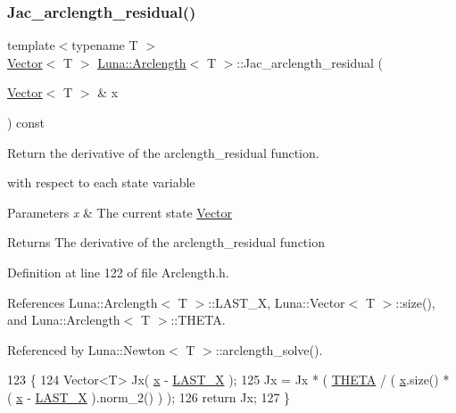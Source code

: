 \subsubsection{\texorpdfstring{Jac\+\_\+arclength\+\_\+residual()}{Jac\_arclength\_residual()}}
{\footnotesize\ttfamily template$<$typename T $>$ \\
\hyperlink{classLuna_1_1Vector}{Vector}$<$ T $>$ \hyperlink{classLuna_1_1Arclength}{Luna\+::\+Arclength}$<$ T $>$\+::Jac\+\_\+arclength\+\_\+residual (\begin{DoxyParamCaption}\item[{\hyperlink{classLuna_1_1Vector}{Vector}$<$ T $>$ \&}]{x }\end{DoxyParamCaption}) const\hspace{0.3cm}{\ttfamily [protected]}}



Return the derivative of the arclength\+\_\+residual function. 

with respect to each state variable 
\begin{DoxyParams}{Parameters}
{\em x} & The current state \hyperlink{classLuna_1_1Vector}{Vector} \\
\hline
\end{DoxyParams}
\begin{DoxyReturn}{Returns}
The derivative of the arclength\+\_\+residual function 
\end{DoxyReturn}


Definition at line 122 of file Arclength.\+h.



References Luna\+::\+Arclength$<$ T $>$\+::\+L\+A\+S\+T\+\_\+X, Luna\+::\+Vector$<$ T $>$\+::size(), and Luna\+::\+Arclength$<$ T $>$\+::\+T\+H\+E\+TA.



Referenced by Luna\+::\+Newton$<$ T $>$\+::arclength\+\_\+solve().


\begin{DoxyCode}
123     \{
124         Vector<T> Jx( \hyperlink{namespaceHeat__plot_aa88370c16b85b784ccbde3ed88bc1991}{x} - \hyperlink{classLuna_1_1Arclength_a6d6ba83245b4dd616d265609a93035a2}{LAST\_X} );
125         Jx = Jx * ( \hyperlink{classLuna_1_1Arclength_aa17766cf4bcbe5b063dc2a95f89baf42}{THETA} / ( \hyperlink{namespaceHeat__plot_aa88370c16b85b784ccbde3ed88bc1991}{x}.size() * ( \hyperlink{namespaceHeat__plot_aa88370c16b85b784ccbde3ed88bc1991}{x} - \hyperlink{classLuna_1_1Arclength_a6d6ba83245b4dd616d265609a93035a2}{LAST\_X} ).norm\_2() ) );
126         \textcolor{keywordflow}{return} Jx;
127     \}
\end{DoxyCode}
\mbox{\label{classLuna_1_1Arclength_ad7be910825086e7faa134bf956342a82}} 
